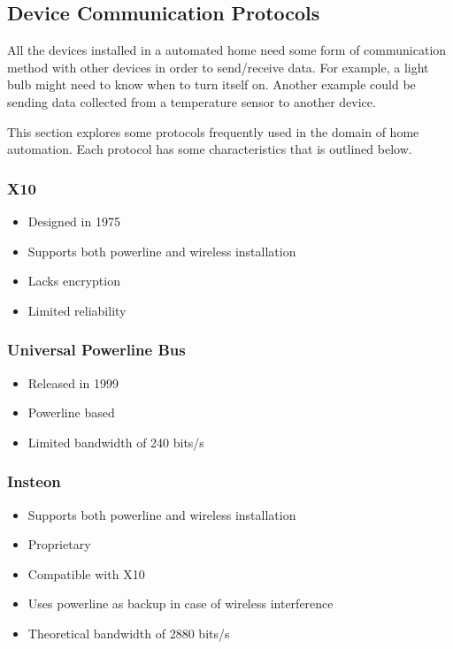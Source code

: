 \subsection{Device Communication Protocols}

All the devices installed in a automated home need some form of communication
method with other devices in order to send/receive data. For example, a light
bulb might need to know when to turn itself on. Another example could be
sending data collected from a temperature sensor to another device.

This section explores some protocols frequently used in the domain of home
automation. Each protocol has some characteristics that is outlined below.

\subsubsection{X10 \cite{wiki_x10}}

\begin{itemize}
\item Designed in 1975
\item Supports both powerline and wireless installation
\item Lacks encryption
\item Limited reliability
\end{itemize}


\subsubsection{Universal Powerline Bus \cite{wiki_upb}}

\begin{itemize}
\item Released in 1999
\item Powerline based
\item Limited bandwidth of 240 bits/s
\end{itemize}


\subsubsection{Insteon\cite{wiki_insteon}}

\begin{itemize}
\item Supports both powerline and wireless installation
\item Proprietary
\item Compatible with X10
\item Uses powerline as backup in case of wireless interference
\item Theoretical bandwidth of 2880 bits/s
\end{itemize}


